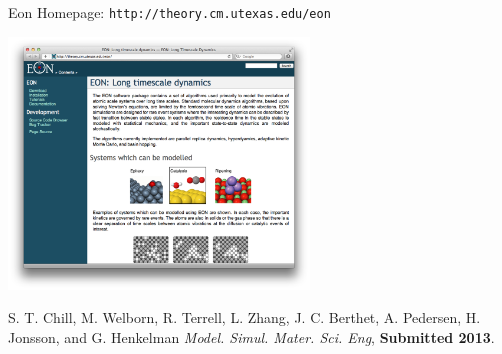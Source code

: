 \documentclass[onlymath]{beamer}
\begin{document}
%
%
%
%
%
%
%	  
%
%
%

\begin{frame}{Eon Homepage: \texttt{http://theory.cm.utexas.edu/eon}}
  \begin{center}
    \includegraphics[width=0.6\textwidth]{images/eon-website.png}
  \end{center}
  \small{S. T. Chill,  M. Welborn, R. Terrell, L. Zhang, J. C. Berthet, A. Pedersen, H. Jonsson, and G. Henkelman \textit{Model. Simul. Mater. Sci. Eng}, \textbf{Submitted 2013}.}
\end{frame}
\end{document}
